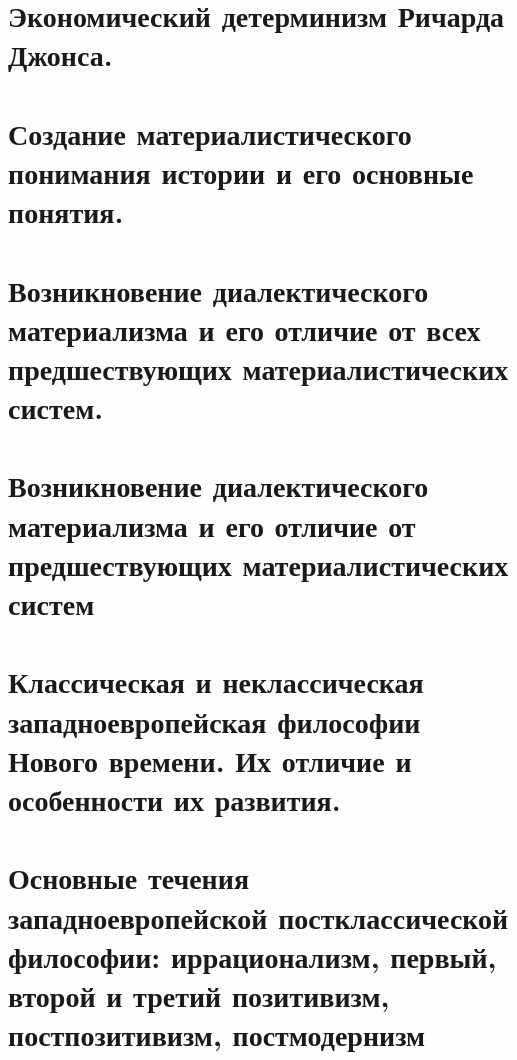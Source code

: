 \section{Экономический детерминизм Ричарда Джонса.}
\section{Создание материалистического понимания истории и его основные понятия.}
\section{Возникновение диалектического материализма и его отличие от всех предшествующих материалистических систем.}
\section{Возникновение диалектического материализма и его отличие от предшествующих материалистических систем}
\section{Классическая и неклассическая западноевропейская философии Нового времени. Их отличие и особенности их развития.}
\section{Основные течения западноевропейской постклассической философии: иррационализм, первый, второй и третий позитивизм, постпозитивизм, постмодернизм}


